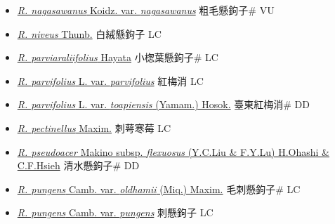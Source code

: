 \begin{itemize}
\begin{itemize}
        \item[] \href{http://www.theplantlist.org/tpl1.1/search?q=Rubus+nagasawanus+var.+nagasawanus}{\textit{R. nagasawanus} Koidz. var. \textit{nagasawanus}}   粗毛懸鉤子\# VU
        \item[] \href{http://www.theplantlist.org/tpl1.1/search?q=Rubus+niveus}{\textit{R. niveus} Thunb.}   白絨懸鉤子 LC
        \item[] \href{http://www.theplantlist.org/tpl1.1/search?q=Rubus+parviaraliifolius}{\textit{R. parviaraliifolius} Hayata}   小楤葉懸鉤子\# LC
        \item[] \href{http://www.theplantlist.org/tpl1.1/search?q=Rubus+parvifolius+var.+parvifolius}{\textit{R. parvifolius} L. var. \textit{parvifolius}}   紅梅消 LC
        \item[] \href{http://www.theplantlist.org/tpl1.1/search?q=Rubus+parvifolius+var.+toapiensis}{\textit{R. parvifolius} L. var. \textit{toapiensis} (Yamam.) Hosok.}   臺東紅梅消\# DD
        \item[] \href{http://www.theplantlist.org/tpl1.1/search?q=Rubus+pectinellus}{\textit{R. pectinellus} Maxim.}   刺萼寒莓 LC
        \item[] \href{http://www.theplantlist.org/tpl1.1/search?q=Rubus+pseudoacer+subsp.+flexuosus}{\textit{R. pseudoacer} Makino subsp. \textit{flexuosus} (Y.C.Liu \& F.Y.Lu) H.Ohashi \& C.F.Hsieh}   清水懸鉤子\# DD
        \item[] \href{http://www.theplantlist.org/tpl1.1/search?q=Rubus+pungens+var.+oldhamii}{\textit{R. pungens} Camb. var. \textit{oldhamii} (Miq.) Maxim.}   毛刺懸鉤子\# LC
        \item[] \href{http://www.theplantlist.org/tpl1.1/search?q=Rubus+pungens+var.+pungens}{\textit{R. pungens} Camb. var. \textit{pungens}}   刺懸鉤子 LC

\end{itemize}
\end{itemize}

